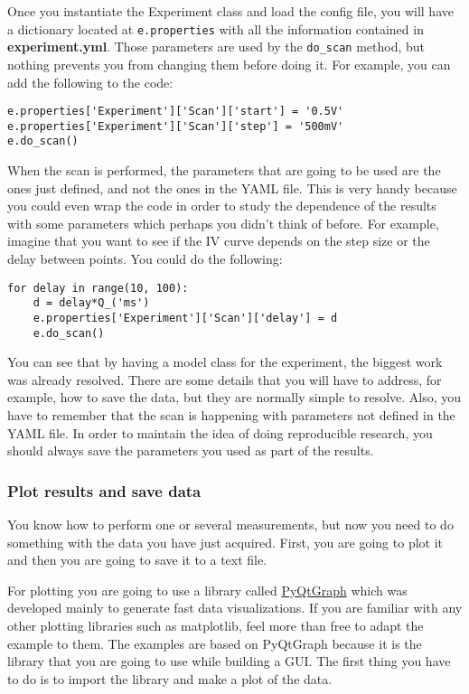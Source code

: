 Once you instantiate the Experiment class and load the config file, you
will have a dictionary located at \texttt{e.properties} with all the
information contained in \textbf{experiment.yml}. Those parameters are
used by the \texttt{do_scan} method, but nothing prevents you from
changing them before doing it. For example, you can add the following to
the code:

\begin{verbatim}
e.properties['Experiment']['Scan']['start'] = '0.5V'
e.properties['Experiment']['Scan']['step'] = '500mV'
e.do_scan()
\end{verbatim}

When the scan is performed, the parameters that are going to be used are
the ones just defined, and not the ones in the {YAML} file. This is very
handy because you could even wrap the code in order to study the
dependence of the results with some parameters which perhaps you didn't
think of before. For example, imagine that you want to see if the {IV}
curve depends on the step size or the delay between points. You could do
the following:

\begin{verbatim}
for delay in range(10, 100):
    d = delay*Q_('ms')
    e.properties['Experiment']['Scan']['delay'] = d
    e.do_scan()
\end{verbatim}

You can see that by having a model class for the experiment, the biggest
work was already resolved. There are some details that you will have to
address, for example, how to save the data, but they are normally simple
to resolve. Also, you have to remember that the scan is happening with
parameters not defined in the {YAML} file. In order to maintain the idea
of doing reproducible research, you should always save the parameters
you used as part of the results.

\subsubsection{Plot results and save data}\label{plot-results-and-savedata}
You know how to perform one or several measurements, but now you need to
do something with the data you have just acquired. First, you are going
to plot it and then you are going to save it to a text file.

For plotting you are going to use a library called
\href{http://www.pyqtgraph.org/}{PyQtGraph} which was developed mainly
to generate fast data visualizations. If you are familiar with any other
plotting libraries such as matplotlib, feel more than free to adapt the
example to them. The examples are based on PyQtGraph because it is the
library that you are going to use while building a {GUI}. The first
thing you have to do is to import the library and make a plot of
the data.

